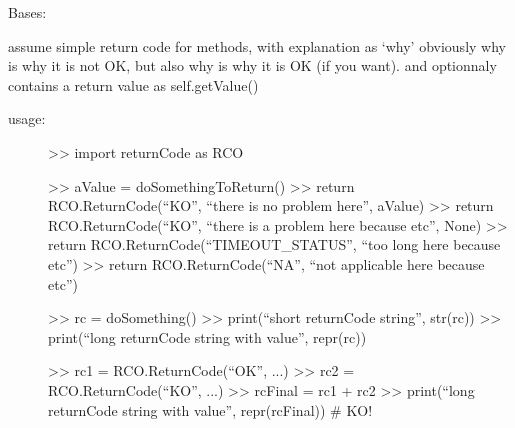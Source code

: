 \documentclass[a4paper,10pt,english]{sphinxmanual}
\begin{document}
\begin{fulllineitems}
\label{commands/apidoc/src:src.returnCode.ReturnCode}
Bases: 

assume simple return code for methods, with explanation as `why'
obviously why is why it is not OK, 
but also why is why it is OK (if you want). 
and optionnaly contains a return value as self.getValue()
\begin{description}
\item[{usage:}] \leavevmode
\textgreater{}\textgreater{} import returnCode as RCO

\textgreater{}\textgreater{} aValue = doSomethingToReturn()
\textgreater{}\textgreater{} return RCO.ReturnCode(``KO'', ``there is no problem here'', aValue)
\textgreater{}\textgreater{} return RCO.ReturnCode(``KO'', ``there is a problem here because etc'', None)
\textgreater{}\textgreater{} return RCO.ReturnCode(``TIMEOUT\_STATUS'', ``too long here because etc'')
\textgreater{}\textgreater{} return RCO.ReturnCode(``NA'', ``not applicable here because etc'')

\textgreater{}\textgreater{} rc = doSomething()
\textgreater{}\textgreater{} print(``short returnCode string'', str(rc))
\textgreater{}\textgreater{} print(``long returnCode string with value'', repr(rc))

\textgreater{}\textgreater{} rc1 = RCO.ReturnCode(``OK'', ...)
\textgreater{}\textgreater{} rc2 = RCO.ReturnCode(``KO'', ...)
\textgreater{}\textgreater{} rcFinal = rc1 + rc2
\textgreater{}\textgreater{} print(``long returnCode string with value'', repr(rcFinal)) \# KO!

\end{description}

\begin{fulllineitems}
\label{commands/apidoc/src:src.returnCode.ReturnCode.KFSYS}
\end{fulllineitems}


\begin{fulllineitems}
\label{commands/apidoc/src:src.returnCode.ReturnCode.KNOWNFAILURE_STATUS}
\end{fulllineitems}


\end{fulllineitems}
\end{document}
